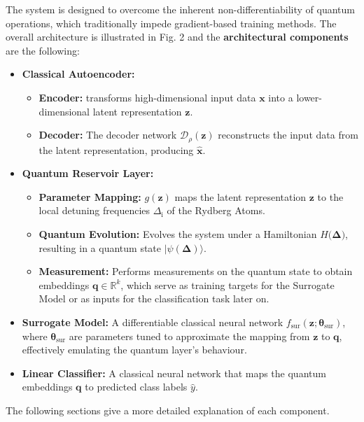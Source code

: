 \documentclass[conference]{IEEEtran}
\begin{document}
The system is designed to overcome the inherent non-differentiability of quantum operations, which traditionally impede gradient-based training methods.
The overall architecture is illustrated in Fig. 2 and the \textbf{architectural components} are the following:
\begin{itemize}
    \item \textbf{Classical Autoencoder:}
        \begin{itemize}
            \item \textbf{Encoder:}
            transforms high-dimensional input data \(\bm{x} \) into 
            a lower-dimensional latent representation \(\bm{z}\).
            \item \textbf{Decoder:}
            The decoder network \(\mathcal{D}_\rho(\bm{z})\) reconstructs the input data from the latent representation, producing \(\bm{\hat{x}}\).
        \end{itemize}

    \item \textbf{Quantum Reservoir Layer:}
        \begin{itemize}
            \item \textbf{Parameter Mapping:}
            \(g(\bm{z})\) maps the latent representation \(\bm{z}\) to the local detuning frequencies
            \(\Delta_{\mathrm{i}}\) of the Rydberg Atoms.
            \item \textbf{Quantum Evolution:}
            Evolves the system under a Hamiltonian \(H(\bm{\Delta)}\), resulting in a quantum 
            state \(|\psi(\bm{\Delta})\rangle\).
            \item \textbf{Measurement:}
            Performs measurements on the quantum state to obtain embeddings \(\bm{q} \in \mathbb{R}^k\), which serve as training targets for the Surrogate Model or as 
            inputs for the classification task later on.
        \end{itemize}

    \item \textbf{Surrogate Model:}
    A differentiable classical neural network \( f_{\text{sur}}(\bm{z}; \bm{\theta}_{\text{sur}}) \),
    where \(\bm{\theta}_{\text{sur}}\) are parameters tuned to approximate the 
    mapping from \(\bm{z}\) to \(\bm{q}\), effectively emulating
    the quantum layer's behaviour.

    \item \textbf{Linear Classifier:}
    A classical neural network that maps the quantum embeddings \(\bm{q}\) to 
    predicted class labels \(\hat{y}\).

\end{itemize}
The following sections give a more detailed explanation of each component.
\end{document}
